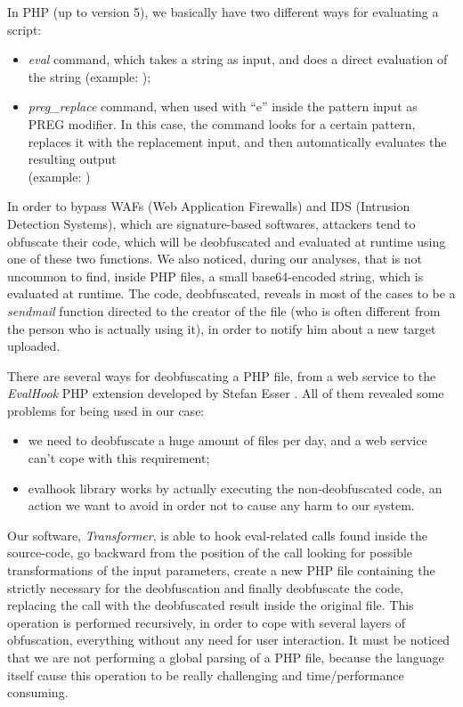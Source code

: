 In PHP (up to version 5), we basically have two different ways for evaluating a script:
\begin{itemize}
\item \emph{eval} command, which takes a string as input, and does a direct evaluation of the string (example: );
\item \emph{preg\_replace} command, when used with ``e'' inside the pattern input as PREG modifier. In this case, the command looks for a certain pattern, replaces it with the replacement input, and then automatically evaluates the resulting output\\(example: ) %
\end{itemize}

In order to bypass WAFs (Web Application Firewalls) and IDS (Intrusion Detection Systems), which are signature-based softwares, attackers tend to obfuscate their code, which will be deobfuscated and evaluated at runtime using one of these two functions.
We also noticed, during our analyses, that is not uncommon to find, inside PHP files, a small base64-encoded string, which is evaluated at runtime. The code, deobfuscated, reveals in most of the cases to be a \emph{sendmail} function directed to the creator of the file (who is often different from the person who is actually using it), in order to notify him about a new target uploaded.

There are several ways for deobfuscating a PHP file, from a web service \cite{webdeobf} to the \emph{EvalHook} PHP extension developed by Stefan Esser \cite{evalhook}. All of them revealed some problems for being used in our case:
\begin{itemize}
\item we need to deobfuscate a huge amount of files per day, and a web service can't cope with this requirement;
\item evalhook library works by actually executing the non-deobfuscated code, an action we want to avoid in order not to cause any harm to our system.
\end{itemize}

Our software, \emph{Transformer}, is able to hook eval-related calls found inside the source-code, go backward from the position of the call looking for possible transformations of the input parameters, create a new PHP file containing the strictly necessary for the deobfuscation and finally deobfuscate the code, replacing the call with the deobfuscated result inside the original file. This operation is performed recursively, in order to cope with several layers of obfuscation, everything without any need for user interaction.
It must be noticed that we are not performing a global parsing of a PHP file, because the language itself cause this operation to be really challenging and time/performance consuming.

